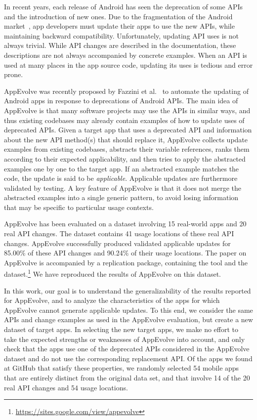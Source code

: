In recent years, each release of Android has seen the deprecation of some
APIs and the introduction of new ones.  Due to the fragmentation of the
Android market~\cite{he2018understanding,li2018cid}, app developers must
update their apps to use the new APIs, while maintaining backward
compatibility.  Unfortunately, updating API uses is not always trivial.
While API changes are described in the documentation, these descriptions
are not always accompanied by concrete examples.  When an API is used at
many places in the app source code, updating its uses is tedious and
error prone.

AppEvolve was recently proposed by Fazzini et
al.~\cite{fazzini2019automated} to automate the updating of Android apps in
response to deprecations of Android APIs.  The main idea of AppEvolve is
that many software projects may use the APIs in similar ways, and thus
existing codebases may already contain examples of how to update uses of
deprecated APIs.  Given a target app that uses a deprecated API and
information about the new API method(s) that should replace it, AppEvolve
collects update examples from existing codebases, abstracts their variable
references, ranks them according to their expected applicability, and then
tries to apply the abstracted examples one by one to the target app.  If an
abstracted example matches the code, the update is said to be {\em
applicable}.  Applicable updates are furthermore validated by testing.  A
key feature of AppEvolve is that it does not merge the abstracted examples
into a single generic pattern, to avoid losing information that may be
specific to particular usage contexts.

AppEvolve has been evaluated on a dataset involving 15 real-world apps and
20 real API changes. The dataset contains 41 usage locations of these real
API changes. AppEvolve successfully produced validated applicable updates
for 85.00\% of these API changes and 90.24\% of their usage locations.  The
paper on AppEvolve is accompanied by a replication package, containing the
tool and the
dataset.\footnote{\url{https://sites.google.com/view/appevolve}} We have
reproduced the results of AppEvolve on this dataset.

In this work, our goal is to understand the generalizability of the results
reported for AppEvolve, and to analyze the characteristics of the apps for
which AppEvolve cannot generate applicable updates.  To this end, we
consider the same APIs and change examples as used in the AppEvolve
evaluation, but create a new dataset of target apps.  In selecting the new
target apps, we make no effort to take the expected strengths or weaknesses
of AppEvolve into account, and only check that the apps use one of the
deprecated APIs considered in the AppEvolve dataset and do not use the
corresponding replacement API.  Of the apps we found at GitHub that satisfy
these properties, we randomly selected 54 mobile apps that are entirely
distinct from the original data set, and that involve 14 of the 20 real API
changes and 54 usage locations.

